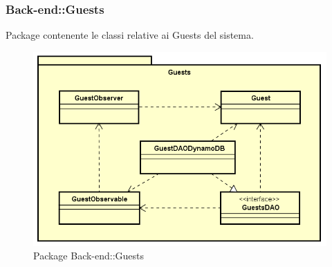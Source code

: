 \subsubsection{Back-end::Guests}
Package contenente le classi relative ai Guests del sistema.
\begin{figure}[h] \centering \includegraphics[width=\textwidth,height=\textheight,keepaspectratio]{images/diagrams/back-end/Official_Backend_0304/Guest.png}
	\caption{Package Back-end::Guests}
\end{figure}
\newpage

